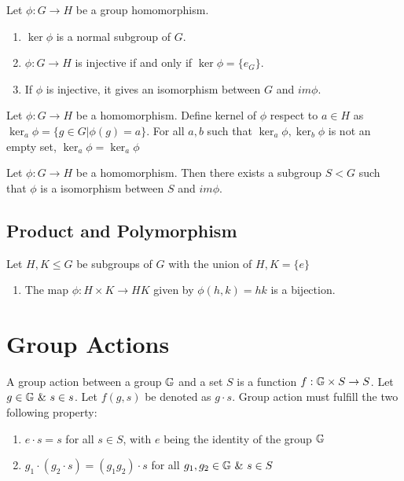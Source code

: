\documentclass[../note.tex]{subfiles}
\begin{document}
\begin{theorem}
	Let $\phi : G \rightarrow H$ be a group homomorphism.
\begin{enumerate}
	\item $\ker{\phi}$ is a normal subgroup of $G$. 
	\item $\phi: G \rightarrow H$ is injective if and only if $\ker{\phi} = \{e_{G}\}$.
	\item If $\phi$ is injective, it gives an isomorphism between $G$ and $im{\phi}$.
\end{enumerate}
\end{theorem}

\begin{hypothesis}
	Let $\phi: G \rightarrow H$ be a homomorphism.
	Define kernel of $\phi$ respect to $a \in H$ as $\ker_a{\phi}=\{g\in G| \phi(g)=a\}$.
	For all $a, b$ such that $\ker_a{\phi}, \ker_b{\phi}$ is not an empty set, $\ker_a{\phi}=\ker_a{\phi}$ 
\end{hypothesis}

\begin{hypothesis}
	Let $\phi: G \rightarrow H$ be a homomorphism. Then there exists a subgroup $S < G$ such that $\phi$ is a isomorphism between $S$ and $im \phi$.
\end{hypothesis}

\subsection{Product and Polymorphism}

\begin{theorem}
	Let $H, K \leq G$ be subgroups of $G$ with the union of $H, K = \{e\}$
	\begin{enumerate}
		\item The map $\phi: H\times K \rightarrow HK$ given by $\phi(h,k) = hk$ is a bijection.
	\end{enumerate}
\end{theorem}
\section{Group Actions}
\begin{definition}
	A group action between a group $\mathbb{G}$ and a set $S$ is a function $f: \mathbb{G}\times S \rightarrow S$. 
	Let $g\in \mathbb{G} \ \&\ s \in s$. Let $f(g,s)$ be denoted as $g\cdot s$. Group action must fulfill the two following property:
	\begin{enumerate}
		\item $e\cdot s=s$ for all $s\in S$, with $e$ being the identity of the group $\mathbb{G}$
		\item $g_1\cdot(g_2 \cdot s) = (g_1 g_2) \cdot s$ for all $g_1, g_2 \in \mathbb{G}\ \&\ s \in S$
	\end{enumerate}
\end{definition}
\end{document}
